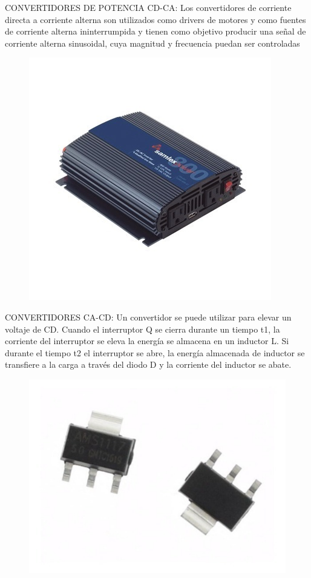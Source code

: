 \documentclass[10pt,letterpaper]{article}
\begin{document}
CONVERTIDORES DE POTENCIA CD-CA:
Los  convertidores  de  corriente  directa  a  corriente  alterna  son  utilizados  como  drivers  de  motores  y  como  fuentes  de  corriente  alterna  ininterrumpida  y  tienen  como  objetivo  producir  una  señal  de  corriente  alterna  sinusoidal,  cuya  magnitud  y  frecuencia  puedan  ser  controladas 
\begin{figure}[h!]
\centering
\includegraphics[scale=.8]{cacD}
\end{figure}
\newpage
CONVERTIDORES CA-CD:
Un convertidor se puede utilizar para elevar un voltaje de CD. Cuando el interruptor Q se cierra durante un tiempo t1, la corriente del interruptor se eleva la energía se almacena en un inductor L.
Si durante el tiempo t2 el interruptor se abre, la energía almacenada de inductor se transfiere a la carga a través del diodo D y la corriente del inductor se abate.
\begin{figure}[h!]
\centering
\includegraphics[scale=.5]{cacd}
\end{figure}
\end{document}
